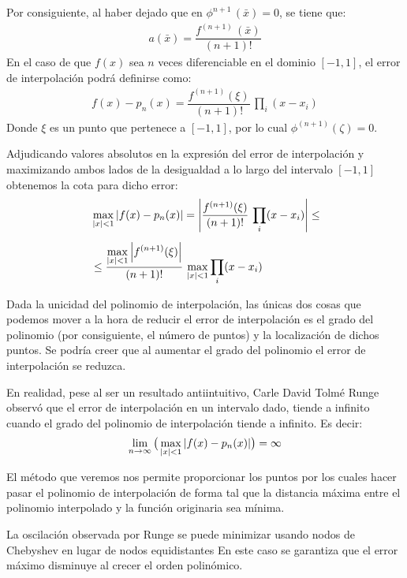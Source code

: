 \documentclass[12pt]{article}
\numberwithin{equation}{section}
\begin{document}
Por consiguiente, al haber dejado que en $\phi^{n+1} \, (\bar{x}) = 0$, se tiene que:
\begin{align*}
a (\bar{x}) = \dfrac{f^{(n+1)} \, (\bar{x})}{(n + 1)!}
\end{align*}
En el caso de que $f(x)$ sea $n$ veces diferenciable en el dominio $[-1, 1]$, el error de interpolación podrá definirse como:
\begin{align*}
f(x) - p_{n}(x) = \dfrac{f^{(n+1)}(\xi)}{(n + 1)!} \, \prod_{i} (x - x_{i})
\end{align*}
Donde $\xi$ es un punto que pertenece a $[-1, 1]$, por lo cual $\phi^{(n+1)}(\zeta) = 0$.
\par
Adjudicando valores absolutos en la expresión del error de interpolación y maximizando ambos lados de la desigualdad a lo largo del intervalo $[-1, 1]$ obtenemos la cota para dicho error:
\begin{align*}
&\max_{\abs{x} < 1} \abs{f(x) - p_{n}(x)} = \abs{\dfrac{f^{(n+1)}(\xi)}{(n + 1)!} \, \prod_{i} (x - x_{i})} \leq \\[0.5em]
&\leq \dfrac{\displaystyle \max_{\abs{x} < 1} \abs{f^{(n+1)}(\xi)}}{(n+1)!} \, \max_{\abs{x} < 1} \prod_{i} (x - x_{i})
\end{align*}

Dada la unicidad del polinomio de interpolación, las únicas dos cosas que podemos mover a la hora de reducir el error de interpolación es el grado del polinomio (por consiguiente, el número de puntos) y la localización de dichos puntos. Se podría creer que al aumentar el grado del polinomio el error de interpolación se reduzca. 
\par
En realidad, pese al ser un resultado antiintuitivo, Carle David Tolmé Runge observó que el error de interpolación en un intervalo dado, tiende a infinito cuando el grado del polinomio de interpolación tiende a infinito. Es decir:
\begin{align*}
\lim_{n \to \infty} \big( \max_{\abs{x} < 1} \abs{f(x) - p_{n}(x)} \big) = \infty
\end{align*}

El método que veremos nos permite proporcionar los puntos por los cuales hacer pasar el polinomio de interpolación de forma tal que la distancia máxima entre el polinomio interpolado y la función originaria sea mínima.
\par
La oscilación observada por Runge se puede minimizar usando nodos de Chebyshev en lugar de nodos equidistantes En este caso se garantiza que el error máximo disminuye al crecer el orden polinómico.
\end{document}
